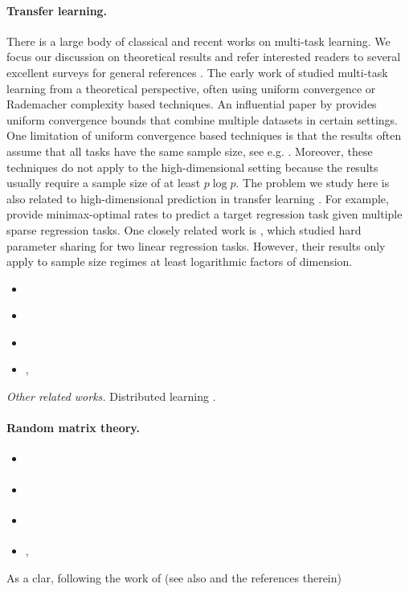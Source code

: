 \paragraph{Transfer learning.}
There is a large body of classical and recent works on multi-task learning.
We focus our discussion on theoretical results and refer interested readers to several excellent surveys for general references \cite{PY09,ZY17,V20}.
The early work of \cite{B00,BS03,M06} studied multi-task learning from a theoretical perspective, often using uniform convergence or Rademacher complexity based techniques.
An influential paper by \cite{BBCK10} provides uniform convergence bounds that combine multiple datasets in certain settings.
One limitation of uniform convergence based techniques is that the results often assume that all  tasks have the same sample size, see e.g. \cite{B00,MPR16}.
Moreover, these techniques do not apply to the high-dimensional setting because the results usually require a sample size of at least $p \log p$.
The problem we study here is also related to high-dimensional prediction in transfer learning \cite{li2020transfer,bastani2020predicting}.
For example, \cite{li2020transfer} provide minimax-optimal rates to predict a target regression task given multiple sparse regression tasks.
\citet{tian2021transfer}
One closely related work is \cite{WZR20}, which studied hard parameter sharing for two linear regression tasks.
However, their results only apply to sample size regimes at least logarithmic factors of dimension.
\begin{itemize}
	\item \citet{lei2021nearoptimal}
	\item \citet{kalan2020minimax}
	\item \citet{cao2019learning}
	\item \citet{hanneke2020value,hanneke2020no}, \citet{cai2021transfer}
\end{itemize}
\textit{Other related works.} Distributed learning \cite{dobriban2018high}.
\citet{chen2021weighted}

\paragraph{Random matrix theory.}
\begin{itemize}
	\item \citet{hastie2019surprises}
	\item \citet{bartlett2020benign}
	\item \citet{liang2020just}
	\item \citet{montanari2019generalization}, \citet{liang2020precise}
\end{itemize}
\begin{remark}
    As a clar,  following the work of \citet{hastie2019surprises} (see also \citet{bartlett2020benign} and the references therein)
\end{remark}

